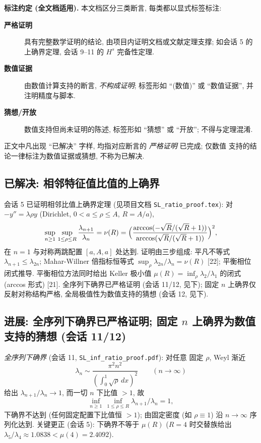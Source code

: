 \documentclass[UTF8]{ctexart}
\begin{document}
\textbf{标注约定 (全文档适用).} 本文档区分三类断言, 每类都以显式标签标注:
\begin{description}
	\item[\textbf{严格证明}] 具有完整数学证明的结论, 由项目内证明文档或文献定理支撑;
		如会话 5 的上确界定理, 会话 9--11 的 $H^s$ 完备性定理.
	\item[\textbf{数值证据}] 由数值计算支持的断言, \emph{不构成证明};
		标签形如 ``(数值)'' 或 ``数值证据'', 并注明精度与脚本.
	\item[\textbf{猜想/开放}] 数值支持但尚未证明的陈述, 标签形如 ``猜想'' 或 ``开放'';
		不得与定理混淆.
\end{description}
正文中凡出现 ``已解决'' 字样, 均指对应断言的 \emph{严格证明} 已完成; 仅数值
支持的结论一律标注为数值证据或猜想, 不称为已解决.

\subsection{已解决: 相邻特征值比值的上确界}

会话 5 已证明相邻比值上确界定理 (见项目文档 \texttt{SL\_ratio\_proof.tex}):
对 $-y''=\lambda\rho y$ (Dirichlet, $0<a\le\rho\le A$, $R=A/a$),
\begin{equation}
	\sup_{n\ge 1}\,\sup_{1\le\rho\le R}\frac{\lambda_{n+1}}{\lambda_n}
	=\nu(R)=\Bigl(\frac{\arccos(-\sqrt{R}/(\sqrt{R}+1))}
	{\arccos(\sqrt{R}/(\sqrt{R}+1))}\Bigr)^2,
\end{equation}
在 $n=1$ 与对称两跳配置 $[a,A,a]$ 处达到. 证明由三步组成: 平凡不等式
$\lambda_{n+1}\le\lambda_{2n}$; Mahar-Willner 倍指标恒等式
$\sup_\rho\lambda_{2n}/\lambda_n=\nu(R)$ [22]; 平衡相位闭式推导.
平衡相位方法同时给出 Keller 极小值 $\mu(R)=\inf_\rho\lambda_2/\lambda_1$ 的闭式
(arccos 形式) [21]. 全序列下确界已严格证明 (会话 11/12, 见下); 固定 $n$ 上确界仅反射对称结构严格, 全局极值性为数值支持的猜想 (会话 12, 见下).

\subsection{进展: 全序列下确界已严格证明; 固定 \texorpdfstring{$n$}{n} 上确界为数值支持的猜想 (会话 11/12)}

\emph{全序列下确界} (会话 11, \texttt{SL\_inf\_ratio\_proof.pdf}): 对任意
固定 $\rho$, Weyl 渐近
\begin{equation}
	\lambda_n \sim \frac{\pi^2 n^2}{(\int_0^1\sqrt{\rho}\,dx)^2}
	\qquad (n \to \infty)
\end{equation}
给出 $\lambda_{n+1}/\lambda_n \to 1$, 而一切 $n$ 下比值
$>1$, 故
\begin{equation}
	\inf_{n\ge1}\,\inf_{1\le\rho\le R}\lambda_{n+1}/\lambda_n = 1,
\end{equation}
下确界不达到 (任何固定配置下比值恒 $>1$); 由固定密度 (如 $\rho\equiv1$)
沿 $n\to\infty$ 序列化达到. 关键更正 (会话 5): 下确界不等于 $\mu(R)$
($R=4$ 时交替族给出 $\lambda_5/\lambda_4\approx1.0838<\mu(4)=2.4092$).
\end{document}
